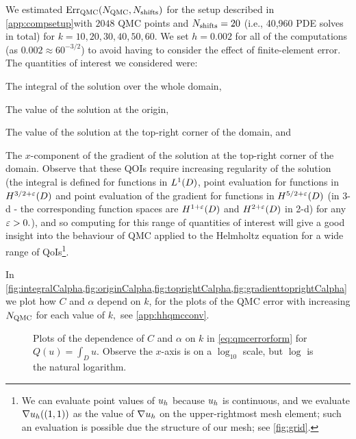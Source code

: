 We estimated $\QMCerror{\NQMC}{\Nshifts}$ for the setup described in \cref{app:compsetup}with $2048$ QMC points and $N_{\mathrm{shifts}}=20$ (i.e., 40,960 PDE solves in total) for $k = 10,20,30,40,50,60$. We set $h = 0.002$ for all of the computations (as $0.002 \approx 60^{-3/2}$) to avoid having to consider the effect of finite-element error. The quantities of interest we considered were:
\bit
\item The integral of the solution over the whole domain,
\item The value of the solution at the origin,
\item The value of the solution at the top-right corner of the domain, and
\item The $x$-component of the gradient of the solution at the top-right corner of the domain.
  \eit
  Observe that these QOIs require increasing regularity of the solution (the integral is defined for functions in $\LoD$, point evaluation for functions in $\Hfn{}{3/2 + \eps}{D}$ and point evaluation of the gradient for functions in $\Hfn{}{5/2+\eps}{D}$ (in 3-d - the corresponding function spaces are $\Hfn{}{1+\eps}{D}$ and $\Hfn{}{2+\eps}{D}$ in 2-d) for any $\varepsilon > 0.$), and so computing for this range of quantities of interest will give a good insight into the behaviour of QMC applied to the Helmholtz equation for a wide range of QoIs\footnote{We can evaluate point values of $u_{h}$ because $u_{h}$ is continuous, and we evaluate $\nabla u_{h}((1,1))$ as the value of $\nabla u_{h}$ on the upper-rightmost mesh element; such an evaluation is possible due the structure of our mesh; see \cref{fig:grid}.}.

In \cref{fig:integralCalpha,fig:originCalpha,fig:toprightCalpha,fig:gradienttoprightCalpha} we plot how $C$ and $\alpha$ depend on $k$, for the plots of the QMC error with increasing $N_{\mathrm{QMC}}$ for each value of $k,$ see \cref{app:hhqmcconv}.

\begin{figure}[h]
    \centering
  \begin{subfigure}{\textwidth}

  \end{subfigure}
    \begin{subfigure}{\textwidth}

    \end{subfigure}
\caption{Plots of the dependence of $C$ and $\alpha$ on $k$ in \cref{eq:qmcerrorform} for $Q(u) = \int_D u$. Observe the $x$-axis is on a $\log_{10}$ scale, but $\log$ is the natural logarithm. \label{fig:integralCalpha}}
\end{figure}

